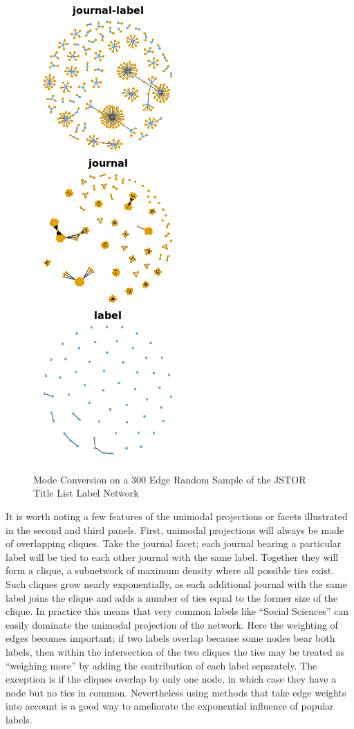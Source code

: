 \documentclass[]{book}
\theoremstyle{definition}
\theoremstyle{definition}
\theoremstyle{definition}
\theoremstyle{remark}
\begin{document}
\begin{figure}

{\centering \includegraphics[width=0.3\linewidth]{02_files/figure-latex/mod-proj-1} \includegraphics[width=0.3\linewidth]{02_files/figure-latex/mod-proj-2} \includegraphics[width=0.3\linewidth]{02_files/figure-latex/mod-proj-3} 

}

\caption{Mode Conversion on a 300 Edge Random Sample of the JSTOR Title List Label Network}\label{fig:mod-proj}
\end{figure}

It is worth noting a few features of the unimodal projections or facets
illustrated in the second and third panels. First, unimodal projections
will always be made of overlapping cliques. Take the journal facet; each
journal bearing a particular label will be tied to each other journal
with the same label. Together they will form a clique, a subnetwork of
maximum density where all possible ties exist. Such cliques grow nearly
exponentially, as each additional journal with the same label joins the
clique and adds a number of ties equal to the former size of the clique.
In practice this means that very common labels like ``Social Sciences''
can easily dominate the unimodal projection of the network. Here the
weighting of edges becomes important; if two labels overlap because some
nodes bear both labels, then within the intersection of the two cliques
the ties may be treated as ``weighing more'' by adding the contribution
of each label separately. The exception is if the cliques overlap by
only one node, in which case they have a node but no ties in common.
Nevertheless using methods that take edge weights into account is a good
way to ameliorate the exponential influence of popular labels.
\end{document}
